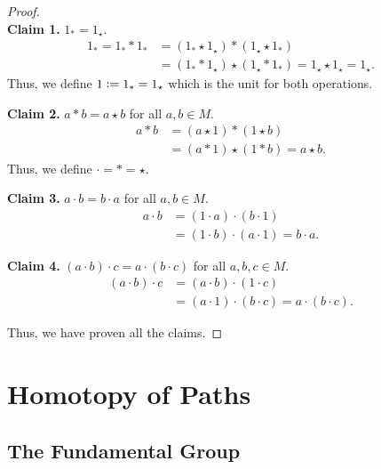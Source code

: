 \documentclass[12pt]{article}
\theoremstyle{definition}
\numberwithin{thm}{section}
\begin{document}
\begin{proof} \phantom{hi}\\
	\textbf{Claim 1.} $1_* = 1_\star.$
	\begin{align*} 
		1_* = 1_* * 1_* &= (1_* \star 1_\star) * (1_\star \star 1_*)\\
		&=(1_* * 1_\star) \star (1_\star * 1_*) = 1_\star \star 1_\star = 1_\star.
	\end{align*}
	Thus, we define $1 \vcentcolon= 1_* = 1_\star$ which is the unit for both operations.

	\dotfill

	\textbf{Claim 2.} $a*b = a\star b$ for all $a, b \in M.$
	\begin{align*} 
		a * b &= (a \star 1) * (1 \star b)\\
		&= (a * 1) \star (1 * b) = a \star b.
	\end{align*}
	Thus, we define $\cdot = * = \star.$

	\dotfill

	\textbf{Claim 3.} $a\cdot b = b\cdot a$ for all $a, b \in M.$
	\begin{align*} 
		a \cdot b &= (1 \cdot a) \cdot (b \cdot 1)\\
		&= (1 \cdot b) \cdot (a \cdot 1) = b \cdot a.
	\end{align*}

	\dotfill

	\textbf{Claim 4.} $(a\cdot b) \cdot c = a\cdot(b\cdot c)$ for all $a, b, c \in M.$
	\begin{align*} 
		(a\cdot b) \cdot c &= (a\cdot b) \cdot (1 \cdot c)\\
		&= (a\cdot 1) \cdot (b \cdot c) = a \cdot (b \cdot c).
	\end{align*}

	Thus, we have proven all the claims.
\end{proof}
\section{Homotopy of Paths}
%
\subsection{The Fundamental Group}
\end{document}
